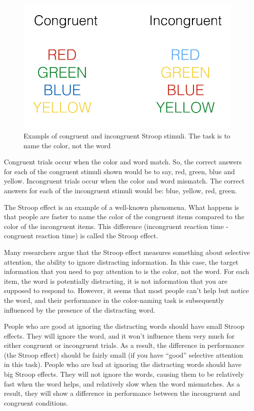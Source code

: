 \documentclass[]{book}
\begin{document}
\begin{figure}
\centering
\includegraphics{figures/Stroop.png}
\caption{\label{fig:9stroop}Exampls of congruent and incongruent Stroop stimuli. The task is to name the color, not the word}
\end{figure}

Congruent trials occur when the color and word match. So, the correct answers for each of the congruent stimuli shown would be to say, red, green, blue and yellow. Incongruent trials occur when the color and word mismatch. The correct answers for each of the incongruent stimuli would be: blue, yellow, red, green.

The Stroop effect is an example of a well-known phenomena. What happens is that people are faster to name the color of the congruent items compared to the color of the incongruent items. This difference (incongruent reaction time - congruent reaction time) is called the Stroop effect.

Many researchers argue that the Stroop effect measures something about selective attention, the ability to ignore distracting information. In this case, the target information that you need to pay attention to is the color, not the word. For each item, the word is potentially distracting, it is not information that you are supposed to respond to. However, it seems that most people can't help but notice the word, and their performance in the color-naming task is subsequently influenced by the presence of the distracting word.

People who are good at ignoring the distracting words should have small Stroop effects. They will ignore the word, and it won't influence them very much for either congruent or incongruent trials. As a result, the difference in performance (the Stroop effect) should be fairly small (if you have ``good'' selective attention in this task). People who are bad at ignoring the distracting words should have big Stroop effects. They will not ignore the words, causing them to be relatively fast when the word helps, and relatively slow when the word mismatches. As a result, they will show a difference in performance between the incongruent and congruent conditions.
\end{document}
